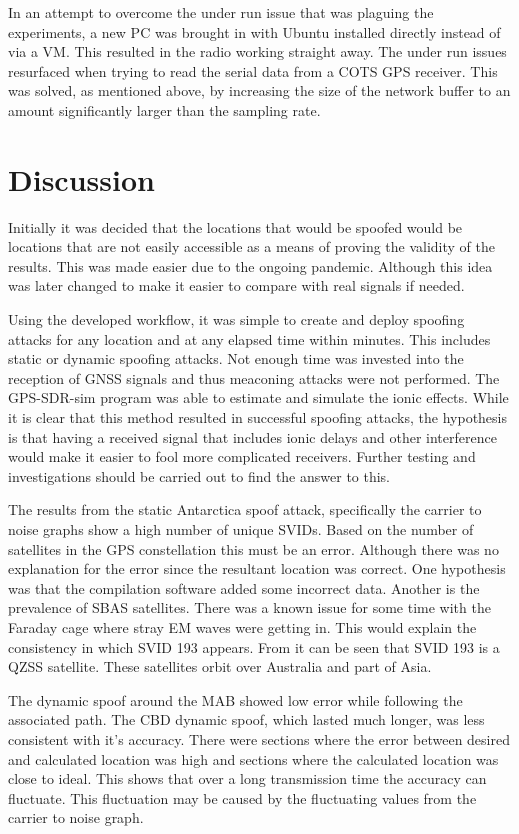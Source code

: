 In an attempt to overcome the under run issue that was plaguing the experiments, a new PC was brought in with Ubuntu installed directly instead of via a VM. This resulted
in the radio working straight away. The under run issues resurfaced when trying to read the serial data from a COTS GPS receiver. This was solved, as mentioned above, by
increasing the size of the network buffer to an amount significantly larger than the sampling rate.

\section{Discussion}
Initially it was decided that the locations that would be spoofed would be locations that are not easily accessible as a means of proving the validity of the results.
This was made easier due to the ongoing pandemic. Although this idea was later changed to make it easier to compare with real signals if needed.

Using the developed workflow, it was simple to create and deploy spoofing attacks for any location and at any elapsed time within minutes. This includes static or dynamic
spoofing attacks. Not enough time was invested into the reception of GNSS signals and thus meaconing attacks were not performed. The GPS-SDR-sim program was able to
estimate and simulate the ionic effects. While it is clear that this method resulted in successful spoofing attacks, the hypothesis is that having a received signal that includes ionic delays
and other interference would make it easier to fool more complicated receivers. Further testing and investigations should be carried out to find the answer to this. 

The results from the static Antarctica spoof attack, specifically the carrier to noise graphs show a high number of unique SVIDs. Based on the number of satellites in the
GPS constellation this must be an error. Although there was no explanation for the error since the resultant location was correct. One hypothesis was that the compilation
software added some incorrect data. Another is the prevalence of SBAS satellites. There was a known issue for some time with the Faraday cage where stray EM waves were
getting in. This would explain the consistency in which SVID 193 appears. From \cite{RN67} it can be seen that SVID 193 is a QZSS satellite. These satellites orbit over
Australia and part of Asia.

The dynamic spoof around the MAB showed low error while following the associated path. The CBD dynamic spoof, which lasted much longer, was less consistent with it's
accuracy. There were sections where the error between desired and calculated location was high and sections where the calculated location was close to ideal. This shows that over a long
transmission time the accuracy can fluctuate. This fluctuation may be caused by the fluctuating values from the carrier to noise graph.

